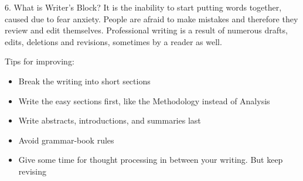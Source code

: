 \documentclass[10pt]{beamer}
\begin{document}
{
	\begin{frame}{6. What is Writer's Block?}
		It is the inability to start putting words together, caused due to fear anxiety. People are afraid to make mistakes and therefore they review and edit themselves. Professional writing is a result of numerous drafts, edits, deletions and revisions, sometimes by a reader as well. 
		\begin{alertblock}{Tips for improving:}
			\begin{itemize}[<+- | alert@+>]
				\item Break the writing into short sections
				\item Write the easy sections first, like the Methodology instead of Analysis
				\item Write abstracts, introductions, and summaries last
				\item Avoid grammar-book rules
				\item Give some time for thought processing in between your writing. But keep revising
			\end{itemize}
		\end{alertblock}
	\end{frame}
}
\end{document}
